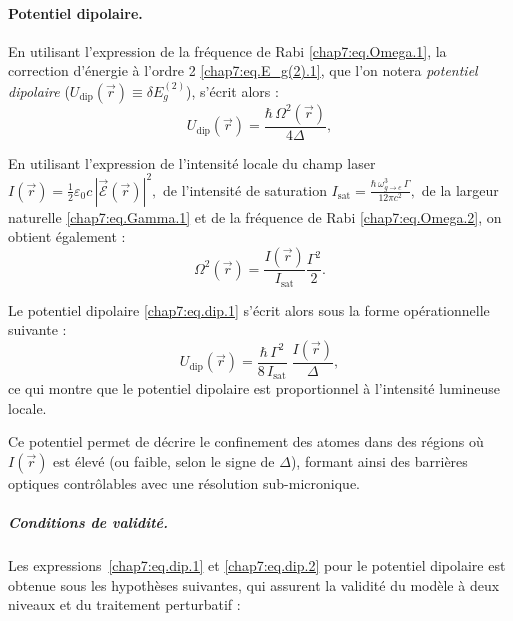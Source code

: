 \paragraph{Potentiel dipolaire.}
En utilisant l'expression de la fréquence de Rabi \eqref{chap7:eq.Omega.1}, la correction d’énergie à l’ordre 2 \eqref{chap7:eq.E_g(2).1}, que l’on notera \emph{potentiel dipolaire} (\ie \(U_{\mathrm{dip}}(\vec{r}) \equiv \delta E_g^{(2)}\)), s’écrit alors :
\begin{equation}\label{chap7:eq.dip.1}
	U_{\mathrm{dip}}(\vec{r}) = \frac{\hbar \, \Omega^2(\vec{r})}{4 \Delta} ,
\end{equation}

\medskip

En utilisant l’expression de l’intensité locale du champ laser 
\(
I(\vec{r}) = \frac{1}{2} \varepsilon_0 c \, |\vec{\mathcal{E}}(\vec{r})|^2,
\) 
de l’intensité de saturation 
\(
I_{\mathrm{sat}} = \frac{\hbar \, \omega_{\scriptscriptstyle g \rightarrow e}^3 \, \Gamma}{12 \pi c^2},
\) 
de la largeur naturelle \eqref{chap7:eq.Gamma.1} et de la fréquence de Rabi \eqref{chap7:eq.Omega.2}, on obtient également :
\begin{equation}
	\Omega^2(\vec{r}) = \frac{I(\vec{r})}{I_{\mathrm{sat}}} \frac{\Gamma^2}{2}.
\end{equation}

Le potentiel dipolaire \eqref{chap7:eq.dip.1} s’écrit alors sous la forme opérationnelle suivante :
\begin{equation}
	U_{\mathrm{dip}}(\vec{r}) = \frac{\hbar \, \Gamma^2}{8 \, I_{\mathrm{sat}}} \; \frac{I(\vec{r})}{\Delta},
	\label{chap7:eq.dip.2}
\end{equation}
ce qui montre que le potentiel dipolaire est proportionnel à l’intensité lumineuse locale.

\medskip

Ce potentiel permet de décrire le confinement des atomes dans des régions où \( I(\vec{r}) \) est élevé (ou faible, selon le signe de \( \Delta \)), formant ainsi des barrières optiques contrôlables avec une résolution sub-micronique.


\subparagraph{Conditions de validité.}

Les expressions~\eqref{chap7:eq.dip.1} et \eqref{chap7:eq.dip.2}  pour le potentiel dipolaire est obtenue sous les hypothèses suivantes, qui assurent la validité du modèle à deux niveaux et du traitement perturbatif :

